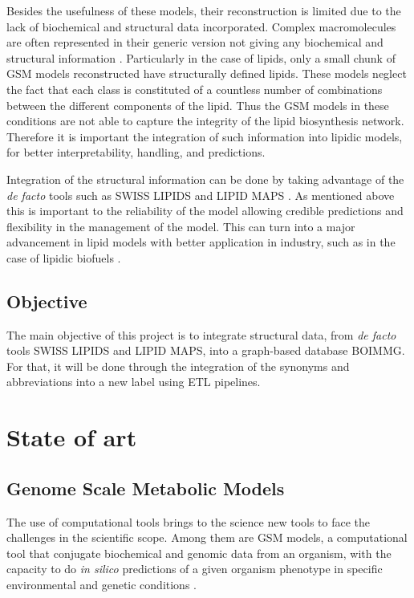 \documentclass{llncs}
\begin{document}
Besides the usefulness of these models, their reconstruction is limited due to the lack of biochemical and structural data incorporated.
Complex macromolecules are often represented in their generic version not giving any biochemical and structural information \cite{Gu2019}.
Particularly in the case of lipids, only a small chunk of GSM models reconstructed have structurally defined lipids. 
These models neglect the fact that each class is constituted of a countless number of combinations between the different components of the lipid. 
Thus the GSM models in these conditions are not able to capture the integrity of the lipid biosynthesis network.
Therefore it is important the integration of such information into lipidic models, for better interpretability, handling, and predictions.

Integration of the structural information can be done by taking advantage of the  \emph{de facto} tools such as SWISS LIPIDS \cite{Aimo2015} and  LIPID MAPS \cite{Sud2007}.
As mentioned above this is important to the reliability of the model allowing credible predictions and flexibility in the management of the model.
This can turn into a major advancement in lipid models with better application in industry, such as in the case of lipidic biofuels \cite{Sawangkeaw2013}.




\subsection{Objective}

The main objective of this project is to integrate structural data, from \emph{de facto} tools SWISS LIPIDS and LIPID MAPS, into a graph-based database BOIMMG.
For that, it will be done through the integration of the synonyms and abbreviations into a new label using ETL pipelines. 

\section{State of art}
\subsection{Genome Scale Metabolic Models}
The use of computational tools brings to the science new tools to face the challenges in the scientific scope.
Among them are GSM models, a computational tool that conjugate biochemical and genomic data from an organism, with the capacity to do \emph{in silico} predictions of a given organism phenotype in specific environmental and genetic conditions \cite{Rocha2007,Zhou2021}.
\end{document}
